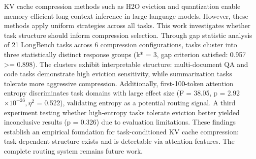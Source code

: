 
KV cache compression methods such as H2O eviction and quantization enable memory-efficient long-context inference in large language models. However, these methods apply uniform strategies across all tasks. This work investigates whether task structure should inform compression selection. Through gap statistic analysis of 21 LongBench tasks across 6 compression configurations, tasks cluster into three statistically distinct response groups (k* = 3, gap criterion satisfied: 0.957 >= 0.898). The clusters exhibit interpretable structure: multi-document QA and code tasks demonstrate high eviction sensitivity, while summarization tasks tolerate more aggressive compression. Additionally, first-100-token attention entropy discriminates task domains with large effect size (F = 38.05, p = 2.92 $\times 10^{-26}, \eta^2$ = 0.522), validating entropy as a potential routing signal. A third experiment testing whether high-entropy tasks tolerate eviction better yielded inconclusive results (p = 0.326) due to evaluation limitations. These findings establish an empirical foundation for task-conditioned KV cache compression: task-dependent structure exists and is detectable via attention features. The complete routing system remains future work.
